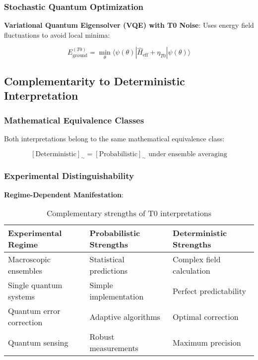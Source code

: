 \documentclass[12pt,a4paper]{article}
\theoremstyle{definition}
\theoremstyle{remark}
\begin{document}
\subsubsection{Stochastic Quantum Optimization}

\textbf{Variational Quantum Eigensolver (VQE) with T0 Noise}:
Uses energy field fluctuations to avoid local minima:

\begin{equation}
	E_{\text{ground}}^{(T0)} = \min_{\theta} \langle \psi(\theta) | \hat{H}_{\text{eff}} + \eta_{T0} | \psi(\theta) \rangle
	\label{eq:vqe_t0_en}
\end{equation}

\subsection{Complementarity to Deterministic Interpretation}

\subsubsection{Mathematical Equivalence Classes}

Both interpretations belong to the same mathematical equivalence class:

\begin{equation}
	\boxed{[\text{Deterministic}]_{\sim} = [\text{Probabilistic}]_{\sim} \text{ under ensemble averaging}}
	\label{eq:equivalence_class_en}
\end{equation}

\subsubsection{Experimental Distinguishability}

\textbf{Regime-Dependent Manifestation}:
\begin{table}[htbp]
	\centering
	\begin{tabular}{|p{4cm}|p{5cm}|p{5cm}|}
		\hline
		\textbf{Experimental Regime} & \textbf{Probabilistic Strengths} & \textbf{Deterministic Strengths} \\
		\hline
		Macroscopic ensembles & Statistical predictions & Complex field calculation \\
		\hline
		Single quantum systems & Simple implementation & Perfect predictability \\
		\hline
		Quantum error correction & Adaptive algorithms & Optimal correction \\
		\hline
		Quantum sensing & Robust measurements & Maximum precision \\
		\hline
	\end{tabular}
	\caption{Complementary strengths of T0 interpretations}
\end{table}
\end{document}
